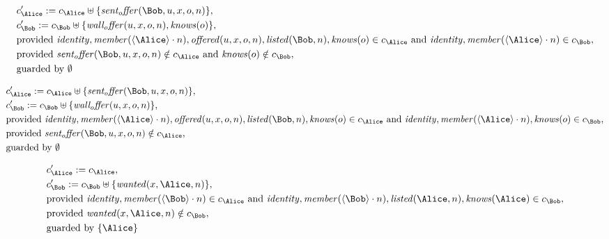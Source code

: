 \begin{align*}
&
c'_
{
\Alice
}
 := 
c_
{
\Alice
}
 \uplus 
\{
\mathit{
sent_offer
}
(
\Bob
,
u
,
x
,
o
,
n
)
\}
,\\
&
c'_
{
\Bob
}
 := 
c_
{
\Bob
}
 \uplus 
\{
\mathit{
wall_offer
}
(
u
,
x
,
o
,
n
)
,
\mathit{
knows
}
(
o
)
\}
,\\
&
\text{provided } 
\mathit{
identity
}
,
\mathit{
member
}
(
\langle
\Alice
\rangle
\cdot
n
)
,
\mathit{
offered
}
(
u
,
x
,
o
,
n
)
,
\mathit{
listed
}
(
\Bob
,
n
)
,
\mathit{
knows
}
(
o
)
 \in c_
{
\Alice
}
 \text{ and } 
\mathit{
identity
}
,
\mathit{
member
}
(
\langle
\Alice
\rangle
\cdot
n
)
 \in c_
{
\Bob
}
,\\
&
\text{provided } 
\mathit{
sent_offer
}
(
\Bob
,
u
,
x
,
o
,
n
)
 \notin c_
{
\Alice
}
 \text{ and } 
\mathit{
knows
}
(
o
)
 \notin c_
{
\Bob
}
,\\
&
\text{guarded by } \emptyset
\end{align*}

\begin{align*}
&
c'_
{
\Alice
}
 := 
c_
{
\Alice
}
 \uplus 
\{
\mathit{
sent_offer
}
(
\Bob
,
u
,
x
,
o
,
n
)
\}
,\\
&
c'_
{
\Bob
}
 := 
c_
{
\Bob
}
 \uplus 
\{
\mathit{
wall_offer
}
(
u
,
x
,
o
,
n
)
\}
,\\
&
\text{provided } 
\mathit{
identity
}
,
\mathit{
member
}
(
\langle
\Alice
\rangle
\cdot
n
)
,
\mathit{
offered
}
(
u
,
x
,
o
,
n
)
,
\mathit{
listed
}
(
\Bob
,
n
)
,
\mathit{
knows
}
(
o
)
 \in c_
{
\Alice
}
 \text{ and } 
\mathit{
identity
}
,
\mathit{
member
}
(
\langle
\Alice
\rangle
\cdot
n
)
,
\mathit{
knows
}
(
o
)
 \in c_
{
\Bob
}
,\\
&
\text{provided } 
\mathit{
sent_offer
}
(
\Bob
,
u
,
x
,
o
,
n
)
 \notin c_
{
\Alice
}
,\\
&
\text{guarded by } \emptyset
\end{align*}

\begin{align*}
&
c'_
{
\Alice
}
 := 
c_
{
\Alice
}
,\\
&
c'_
{
\Bob
}
 := 
c_
{
\Bob
}
 \uplus 
\{
\mathit{
wanted
}
(
x
,
\Alice
,
n
)
\}
,\\
&
\text{provided } 
\mathit{
identity
}
,
\mathit{
member
}
(
\langle
\Bob
\rangle
\cdot
n
)
 \in c_
{
\Alice
}
 \text{ and } 
\mathit{
identity
}
,
\mathit{
member
}
(
\langle
\Bob
\rangle
\cdot
n
)
,
\mathit{
listed
}
(
\Alice
,
n
)
,
\mathit{
knows
}
(
\Alice
)
 \in c_
{
\Bob
}
,\\
&
\text{provided } 
\mathit{
wanted
}
(
x
,
\Alice
,
n
)
 \notin c_
{
\Bob
}
,\\
&
\text{guarded by } \{
\Alice
\}
\end{align*}
